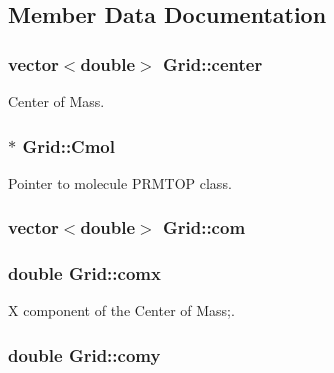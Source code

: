 \subsection{Member Data Documentation}
\hypertarget{classGrid_a9a5662b9d7dafec37fe08f5851f7926c}{
\subsubsection[{center}]{\setlength{\rightskip}{0pt plus 5cm}vector$<$double$>$ {\bf Grid::center}}}
\label{classGrid_a9a5662b9d7dafec37fe08f5851f7926c}


Center of Mass. 

\hypertarget{classGrid_ab5087e114551f00fbb0d281b801d3dfc}{
\subsubsection[{Cmol}]{$\ast$ {\bf Grid::Cmol}}}
\label{classGrid_ab5087e114551f00fbb0d281b801d3dfc}


Pointer to molecule PRMTOP class. 

\hypertarget{classGrid_a46c4f059aba71bdb9b3eecac4b7275a8}{
\subsubsection[{com}]{\setlength{\rightskip}{0pt plus 5cm}vector$<$double$>$ {\bf Grid::com}}}
\label{classGrid_a46c4f059aba71bdb9b3eecac4b7275a8}
\hypertarget{classGrid_ac49fae4528db3bc897b5c99d6b5a5a1d}{
\subsubsection[{comx}]{\setlength{\rightskip}{0pt plus 5cm}double {\bf Grid::comx}}}
\label{classGrid_ac49fae4528db3bc897b5c99d6b5a5a1d}


X component of the Center of Mass;. 

\hypertarget{classGrid_a594a208bcfd831efadc544c051f62f30}{
\subsubsection[{comy}]{\setlength{\rightskip}{0pt plus 5cm}double {\bf Grid::comy}}}
\label{classGrid_a594a208bcfd831efadc544c051f62f30}


